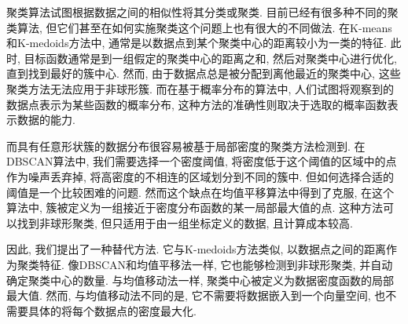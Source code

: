 聚类算法试图根据数据之间的相似性将其分类或聚类. 目前已经有很多种不同的聚类算法\cite{Xu2005}, 但它们甚至在如何实施聚类这个问题上也有很大的不同做法. 在K-means\cite{MacQueen1967}和K-medoids\cite{Kaufman2009}方法中, 通常是以数据点到某个聚类中心的距离较小为一类的特征. 此时, 目标函数通常是到一组假定的聚类中心的距离之和, 然后对聚类中心进行优化\cite{Kaufman2009,Frey2007,Jr1963,Hoeppner1999}, 直到找到最好的簇中心. 然而, 由于数据点总是被分配到离他最近的聚类中心, 这些聚类方法无法应用于非球形簇\cite{Jain2010}. 而在基于概率分布的算法中, 人们试图将观察到的数据点表示为某些函数的概率分布\cite{McLachlan2007}, 这种方法的准确性则取决于选取的概率函数表示数据的能力. 

而具有任意形状簇的数据分布很容易被基于局部密度的聚类方法检测到. 在DBSCAN\cite{Ester1996}算法中, 我们需要选择一个密度阈值, 将密度低于这个阈值的区域中的点作为噪声丢弃掉, 将高密度的不相连的区域划分到不同的簇中. 但如何选择合适的阈值是一个比较困难的问题. 然而这个缺点在均值平移算法中得到了克服\cite{Fukunaga1975,Cheng1995}, 在这个算法中, 簇被定义为一组接近于密度分布函数的某一局部最大值的点. 这种方法可以找到非球形聚类, 但只适用于由一组坐标定义的数据, 且计算成本较高. 

因此, 我们提出了一种替代方法. 它与K-medoids方法类似, 以数据点之间的距离作为聚类特征. 像DBSCAN和均值平移法一样, 它也能够检测到非球形聚类, 并自动确定聚类中心的数量. 与均值移动法一样, 聚类中心被定义为数据密度函数的局部最大值. 然而, 与均值移动法不同的是, 它不需要将数据嵌入到一个向量空间, 也不需要具体的将每个数据点的密度最大化. 
